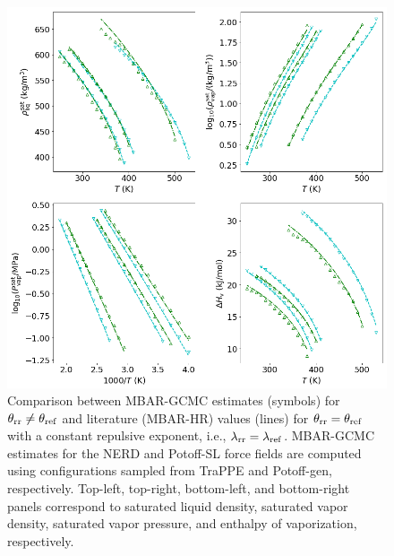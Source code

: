 \documentclass[journal=jced,manuscript=article]{achemso}
\begin{document}

	\begin{figure}[htb!]
		\centering
		\includegraphics[width=6.4in]{refFF_to_rrFF_lam_constant.png}
		\caption{Comparison between MBAR-GCMC estimates (symbols) for $\theta_{\rm rr} \neq \theta_{\rm ref}$ and literature (MBAR-HR) values (lines) for $\theta_{\rm rr} = \theta_{\rm ref}$ with a constant repulsive exponent, i.e., $\lambda_{\rm rr} = \lambda_{\rm ref}$. MBAR-GCMC estimates for the NERD and Potoff-SL force fields are computed using configurations sampled from TraPPE and Potoff-gen, respectively. Top-left, top-right, bottom-left, and bottom-right panels correspond to saturated liquid density, saturated vapor density, saturated vapor pressure, and enthalpy of vaporization, respectively.}
		\label{fig:refFF_to_rrFF_lam_constant}
	\end{figure}
\end{document}
